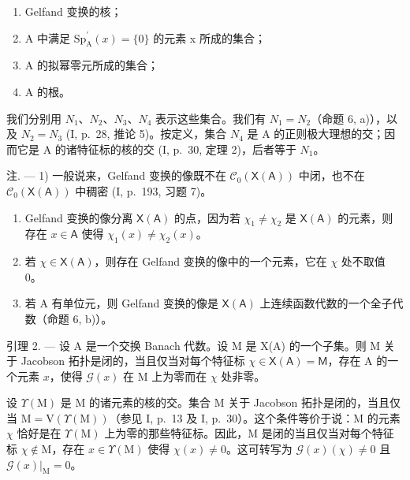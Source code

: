 \begin{enumerate}
\def\labelenumi{(\roman{enumi})}
\item
  Gelfand 变换的核；
\item
  A 中满足 \(\mathrm{Sp}_{\mathrm{A}}^{\prime}(x)=\{0\}\) 的元素 x 所成的集合；
\item
  A 的拟幂零元所成的集合；
\item
  A 的根。
\end{enumerate}

我们分别用 \(N_{1}\)、\(N_{2}\)、\(N_{3}\)、\(N_{4}\) 表示这些集合。我们有 \(N_{1} = N_{2}\)（命题 6, a)），以及 \(N_{2} = N_{3}\) (I, p.~28, 推论 5)。按定义，集合 \(N_{4}\) 是 A 的正则极大理想的交；因而它是 A 的诸特征标的核的交 (I, p.~30, 定理 2)，后者等于 \(N_{1}\)。

注. --- 1) 一般说来，Gelfand 变换的像既不在 \(\mathcal{C}_{0}(\mathsf{X}(\mathsf{A}))\) 中闭，也不在 \(\mathcal{C}_{0}(\mathsf{X}(\mathsf{A}))\) 中稠密 (I, p.~193, 习题 7)。

\begin{enumerate}
\def\labelenumi{\arabic{enumi})}
\setcounter{enumi}{1}
\item
  Gelfand 变换的像分离 \(\mathsf{X}(\mathsf{A})\) 的点，因为若 \(\chi_1 \neq \chi_2\) 是 \(\mathsf{X}(\mathsf{A})\) 的元素，则存在 \(x \in \mathsf{A}\) 使得 \(\chi_1(x) \neq \chi_2(x)\)。
\item
  若 \(\chi \in \mathsf{X}(\mathsf{A})\)，则存在 Gelfand 变换的像中的一个元素，它在 \(\chi\) 处不取值 0。
\item
  若 A 有单位元，则 Gelfand 变换的像是 \(\mathsf{X}(\mathsf{A})\) 上连续函数代数的一个全子代数（命题 6, b)）。
\end{enumerate}

引理 2. --- 设 A 是一个交换 Banach 代数。设 M 是 X(A) 的一个子集。则 M 关于 Jacobson 拓扑是闭的，当且仅当对每个特征标 \(\chi \in \mathsf{X}(\mathsf{A}) = \mathsf{M}\)，存在 A 的一个元素 \(x\)，使得 \(\mathcal{G}(x)\) 在 M 上为零而在 \(\chi\) 处非零。

设 \(\Upsilon(\mathrm{M})\) 是 M 的诸元素的核的交。集合 M 关于 Jacobson 拓扑是闭的，当且仅当 \(\mathrm{M} = \mathrm{V}(\Upsilon(\mathrm{M}))\)（参见 I, p.~13 及 I, p.~30）。这个条件等价于说：M 的元素 \(\chi\) 恰好是在 \(\Upsilon(\mathrm{M})\) 上为零的那些特征标。因此，M 是闭的当且仅当对每个特征标 \(\chi \notin \mathrm{M}\)，存在 \(x \in \Upsilon(\mathrm{M})\) 使得 \(\chi(x) \neq 0\)。这可转写为 \(\mathcal{G}(x)(\chi) \neq 0\) 且 \(\mathcal{G}(x)|_{\mathrm{M}} = 0\)。

